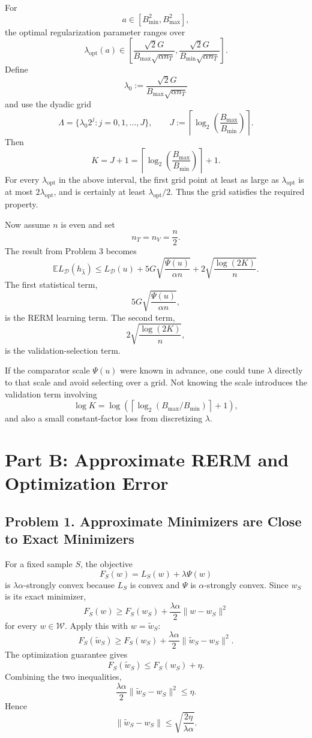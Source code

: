 \documentclass{article}
\newcommand{\EE}{\mathbb{E}}
\newcommand{\cD}{\mathcal{D}}
\newcommand{\cW}{\mathcal{W}}
\begin{document}
For
$$
a\in[B_{\min}^2,B_{\max}^2],
$$
the optimal regularization parameter ranges over
$$
\lambda_{\mathrm{opt}}(a)
\in
\left[
\frac{\sqrt{2}G}{B_{\max}\sqrt{\alpha n_T}},
\frac{\sqrt{2}G}{B_{\min}\sqrt{\alpha n_T}}
\right].
$$
Define
$$
\lambda_0:=\frac{\sqrt{2}G}{B_{\max}\sqrt{\alpha n_T}}
$$
and use the dyadic grid
$$
\Lambda
=
\{\lambda_0 2^j: j=0,1,\dots,J\},
\qquad
J:=\left\lceil \log_2\!\left(\frac{B_{\max}}{B_{\min}}\right)\right\rceil.
$$
Then
$$
K=J+1
=
\left\lceil \log_2\!\left(\frac{B_{\max}}{B_{\min}}\right)\right\rceil+1.
$$
For every $\lambda_{\mathrm{opt}}$ in the above interval, the first grid point at least as large as $\lambda_{\mathrm{opt}}$ is at most $2\lambda_{\mathrm{opt}}$, and is certainly at least $\lambda_{\mathrm{opt}}/2$. Thus the grid satisfies the required property.

Now assume $n$ is even and set
$$
n_T=n_V=\frac n2.
$$
The result from Problem 3 becomes
$$
\EE L_{\cD}(h_{\widehat{\lambda}})
\le
L_{\cD}(u)
+
5G\sqrt{\frac{\Psi(u)}{\alpha n}}
+
2\sqrt{\frac{\log(2K)}{n}}.
$$
The first statistical term,
$$
5G\sqrt{\frac{\Psi(u)}{\alpha n}},
$$
is the RERM learning term. The second term,
$$
2\sqrt{\frac{\log(2K)}{n}},
$$
is the validation-selection term.

If the comparator scale $\Psi(u)$ were known in advance, one could tune $\lambda$ directly to that scale and avoid selecting over a grid. Not knowing the scale introduces the validation term involving
$$
\log K
=
\log\!\left(
\left\lceil \log_2(B_{\max}/B_{\min})\right\rceil+1
\right),
$$
and also a small constant-factor loss from discretizing $\lambda$.

\newpage
\section{Part B: Approximate RERM and Optimization Error}

\subsection{Problem 1. Approximate Minimizers are Close to Exact Minimizers}

For a fixed sample $S$, the objective
$$
F_S(w)=L_S(w)+\lambda\Psi(w)
$$
is $\lambda\alpha$-strongly convex because $L_S$ is convex and $\Psi$ is $\alpha$-strongly convex. Since $w_S$ is its exact minimizer,
$$
F_S(w)\ge F_S(w_S)+\frac{\lambda\alpha}{2}\|w-w_S\|^2
$$
for every $w\in\cW$.
Apply this with $w=\widetilde{w}_S$:
$$
F_S(\widetilde{w}_S)
\ge
F_S(w_S)+\frac{\lambda\alpha}{2}\|\widetilde{w}_S-w_S\|^2.
$$
The optimization guarantee gives
$$
F_S(\widetilde{w}_S)\le F_S(w_S)+\eta.
$$
Combining the two inequalities,
$$
\frac{\lambda\alpha}{2}\|\widetilde{w}_S-w_S\|^2\le \eta.
$$
Hence
$$
\|\widetilde{w}_S-w_S\|
\le
\sqrt{\frac{2\eta}{\lambda\alpha}}.
$$
\end{document}

